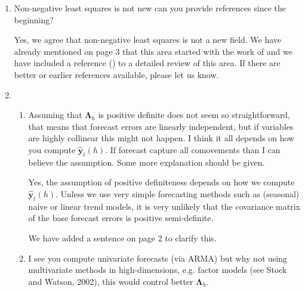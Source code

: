 \documentclass[10pt,a4paper]{article}
\begin{document}
\begin{enumerate}


\item
  Non-negative least squares is not new can you provide references since the beginning?

  {\color{blue} Yes, we agree that non-negative least squares is not a new field. We have already mentioned on page 3 that this area started with the work of \citet{Lawson1974} and we have included a reference (\citet{Chen2009}) to a detailed review of this area. If there are better or earlier references available, please let us know.}

\item
  \begin{enumerate}
  \item
    Assuming that $\bm{\Lambda}_h$ is positive definite does not seem so straightforward, that means that forecast errors are linearly independent, but if variables are highly collinear this might not happen. I think it all depends on how you compute $\hat{\bm{y}}_t(h)$. If forecast capture all comovements than I can believe the assumption. Some more explanation should be given.

    {\color{blue} Yes, the assumption of positive definiteness depends on how we compute $\hat{\bm{y}}_t(h)$. Unless we use very simple forecasting methods such as (seasonal) naive or linear trend models, it is very unlikely that the covariance matrix of the base forecast errors is positive semi-definite.

    We have added a sentence on page 2 to clarify this.}

  \item
    I see you compute univariate forecasts (via ARMA) but why not using multivariate methods in high-dimensions, e.g. factor models (see Stock and Watson, 2002), this would control better $\bm{\Lambda}_h$.


\end{enumerate}
\end{enumerate}
\end{document}
